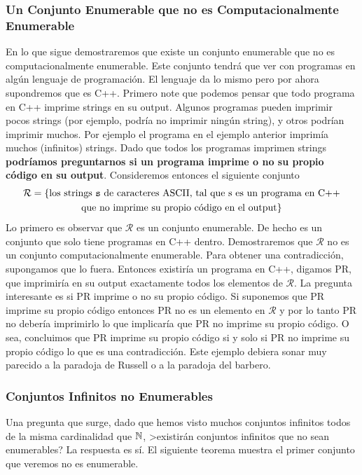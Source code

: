 \subsubsection*{Un Conjunto Enumerable que no es Computacionalmente Enumerable}

En lo que sigue demostraremos que existe un conjunto enumerable que no es computacionalmente enumerable. 
Este conjunto tendrá que ver con programas en algún lenguaje de programación. 
El lenguaje da lo mismo pero por ahora supondremos que es C++.
Primero note que podemos pensar que todo programa en C++ imprime strings en su output. 
Algunos programas pueden imprimir pocos strings (por ejemplo, podría no imprimir ningún string), 
y otros podrían imprimir muchos. 
Por ejemplo el programa en el ejemplo anterior imprimía muchos (infinitos) strings. 
Dado que todos los programas imprimen strings {\bf podríamos preguntarnos si un programa imprime o no su propio código en su output}. 
Consideremos entonces el siguiente conjunto
\begin{multline*}
\mathcal{R} = \{\text{los strings \texttt{s} de caracteres ASCII, tal que s es un programa en C++}\\
\text{que no imprime su propio código en el output}\}
\end{multline*}
Lo primero es observar que $\mathcal{R}$ es un conjunto enumerable. 
De hecho es un conjunto que solo tiene programas en C++ dentro. Demostraremos que $\mathcal{R}$ no es un conjunto computacionalmente enumerable. 
Para obtener una contradicción, supongamos que lo fuera. 
Entonces existiría un programa en C++, digamos PR, que imprimiría en su output exactamente todos los elementos de $\mathcal{R}$. 
La pregunta interesante es si PR imprime o no su propio código. 
Si suponemos que PR imprime su propio código entonces PR no es un elemento en $\mathcal{R}$ y por lo tanto PR no debería imprimirlo lo que implicaría que PR no imprime su propio código. O sea, concluimos que PR imprime su propio código si y solo si PR no imprime su propio código lo que es una 
contradicción.
Este ejemplo debiera sonar muy parecido a la paradoja de Russell o a la paradoja del barbero.

\subsubsection*{Conjuntos Infinitos no Enumerables}

Una pregunta que surge, dado que hemos visto muchos conjuntos infinitos todos de la misma cardinalidad que $\mathbb{N}$, >existirán conjuntos infinitos que no sean enumerables? 
La respuesta es sí.
El siguiente teorema muestra el primer conjunto que veremos no es enumerable.

